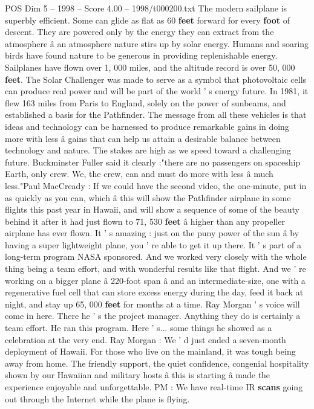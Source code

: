\begin{textsample}{POS Dim 5 – 1998 – Score 4.00 – 1998/t000200.txt}
The modern sailplane is superbly efficient.
Some can glide as flat as 60 \textbf{feet} forward for every \textbf{foot} of descent.
They are powered only by the energy they can extract from the atmosphere â an atmosphere nature stirs up by solar energy.
Humans and soaring birds have found nature to be generous in providing replenishable energy.
Sailplanes have flown over 1, 000 miles, and the altitude record is over 50, 000 \textbf{feet}.
The Solar Challenger was made to serve as a symbol that photovoltaic cells can produce real power and will be part of the world ' s energy future.
In 1981, it flew 163 miles from Paris to England, solely on the power of sunbeams, and established a basis for the Pathfinder.
The message from all these vehicles is that ideas and technology can be harnessed to produce remarkable gains in doing more with less â gains that can help us attain a desirable balance between technology and nature.
The stakes are high as we speed toward a challenging future.
Buckminster Fuller said it clearly :"there are no passengers on spaceship Earth, only crew.
We, the crew, can and must do more with less â much less."Paul MacCready : If we could have the second video, the one-minute, put in as quickly as you can, which â this will show the Pathfinder airplane in some flights this past year in Hawaii, and will show a sequence of some of the beauty behind it after it had just flown to 71, 530 \textbf{feet} â higher than any propeller airplane has ever flown.
It ' s amazing : just on the puny power of the sun â by having a super lightweight plane, you ' re able to get it up there.
It ' s part of a long-term program NASA sponsored.
And we worked very closely with the whole thing being a team effort, and with wonderful results like that flight.
And we ' re working on a bigger plane â 220-foot span â and an intermediate-size, one with a regenerative fuel cell that can store excess energy during the day, feed it back at night, and stay up 65, 000 \textbf{feet} for months at a time.
Ray Morgan ' s voice will come in here.
There he ' s the project manager.
Anything they do is certainly a team effort.
He ran this program.
Here ' s... some things he showed as a celebration at the very end.
Ray Morgan : We ' d just ended a seven-month deployment of Hawaii.
For those who live on the mainland, it was tough being away from home.
The friendly support, the quiet confidence, congenial hospitality shown by our Hawaiian and military hosts â this is starting â made the experience enjoyable and unforgettable.
PM : We have real-time IR \textbf{scans} going out through the Internet while the plane is flying.

\end{textsample}
